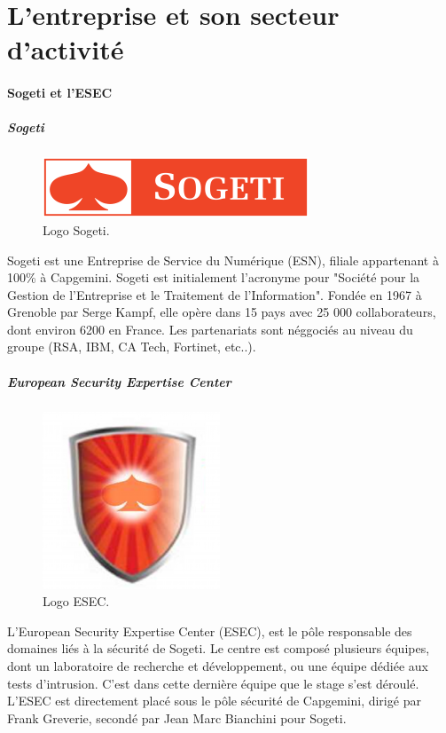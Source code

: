 \section*{L'entreprise et son secteur d'activité}
\paragraph{Sogeti et l'ESEC}
\subparagraph{Sogeti}
\begin{figure}[h]
    \centering
    \includegraphics[scale=0.7]{sogeti.png}
    \caption{Logo Sogeti.}
\end{figure}
Sogeti est une Entreprise de Service du Numérique (ESN), filiale appartenant
à 100\% à Capgemini. Sogeti est initialement l'acronyme pour "Société pour la Gestion de
l'Entreprise et le Traitement de l'Information". Fondée en 1967 à Grenoble par Serge Kampf, elle opère
dans 15 pays avec 25 000 collaborateurs, dont environ 6200 en France. Les partenariats sont néggociés au niveau
du groupe (RSA, IBM, CA Tech, Fortinet, etc..).

\subparagraph{European Security Expertise Center}
\begin{figure}[h]
    \centering
    \includegraphics[scale=0.4]{esec.png}
    \caption{Logo ESEC.}
\end{figure}
L'European Security Expertise Center (ESEC), est le pôle responsable des domaines
liés à la sécurité de Sogeti. Le centre est composé plusieurs équipes, dont un
laboratoire de recherche et développement, ou une équipe dédiée aux tests d'intrusion.
C'est dans cette dernière équipe que le stage s'est déroulé.
L'ESEC est directement placé sous le pôle sécurité de Capgemini, dirigé par Frank
Greverie, secondé par Jean Marc Bianchini pour Sogeti.


